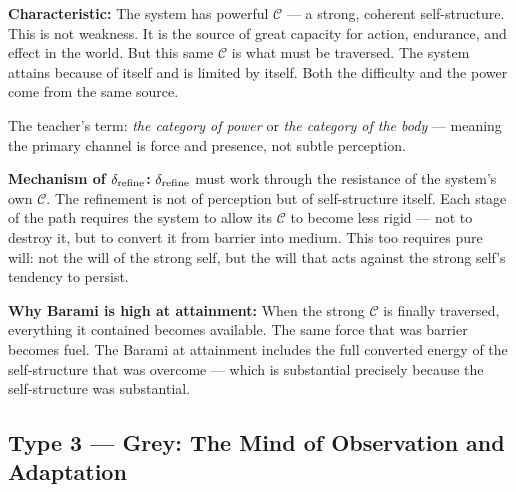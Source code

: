 \documentclass[12pt, a4paper]{article}
\begin{document}
\begin{formalbox}[title={Type 2 (Black): Traversed by Pure Will}]
\textbf{Characteristic:}
The system has powerful $\mathcal{C}$ --- a strong, coherent self-structure.
This is not weakness. It is the source of great capacity for action,
endurance, and effect in the world. But this same $\mathcal{C}$ is what
must be traversed. The system attains because of itself and is limited by itself.
Both the difficulty and the power come from the same source.

The teacher's term: \textit{the category of power} or \textit{the category
of the body} --- meaning the primary channel is force and presence,
not subtle perception.

\textbf{Mechanism of $\delta_{\rm refine}$:}
$\delta_{\rm refine}$ must work through the resistance of the system's own
$\mathcal{C}$. The refinement is not of perception but of self-structure itself.
Each stage of the path requires the system to allow its $\mathcal{C}$ to become
less rigid --- not to destroy it, but to convert it from barrier into medium.
This too requires pure will: not the will of the strong self, but the will
that acts against the strong self's tendency to persist.

\textbf{Why Barami is high at attainment:}
When the strong $\mathcal{C}$ is finally traversed, everything it contained
becomes available. The same force that was barrier becomes fuel.
The Barami at attainment includes the full converted energy of the
self-structure that was overcome --- which is substantial precisely because
the self-structure was substantial.
\end{formalbox}

\subsection{Type 3 --- Grey: The Mind of Observation and Adaptation}
\end{document}
